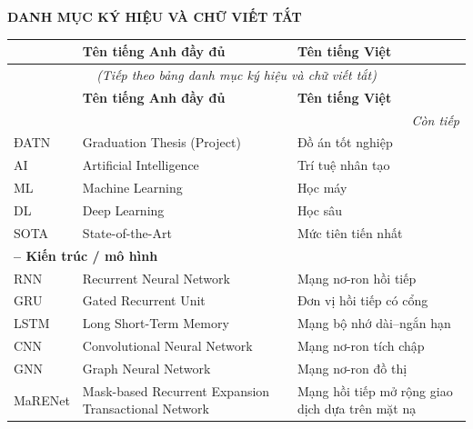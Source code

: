 
\cleardoublepage
{}  %
\thispagestyle{empty}

\begin{center}
    {\bfseries\LARGE DANH MỤC KÝ HIỆU VÀ CHỮ VIẾT TẮT}
\end{center}\vspace{1em}

\begingroup
\setlength\LTleft{0pt}     %
\setlength\LTright{0pt}    %
\small                    %

\begin{longtable}{@{}p{2.5cm} p{6.5cm} p{5.5cm}@{}}  %
\toprule
\textbf{} & \textbf{Tên tiếng Anh đầy đủ} & \textbf{Tên tiếng Việt} \\
\midrule
\endfirsthead

\multicolumn{3}{c}{\itshape (Tiếp theo bảng danh mục ký hiệu và chữ viết tắt)}\\
\textbf{} & \textbf{Tên tiếng Anh đầy đủ} & \textbf{Tên tiếng Việt} \\
\midrule
\endhead

\midrule
\multicolumn{3}{r}{\itshape Còn tiếp}\\
\endfoot
\bottomrule
\endlastfoot

ĐATN     & Graduation Thesis (Project)              & Đồ án tốt nghiệp \\
AI       & Artificial Intelligence                  & Trí tuệ nhân tạo \\
ML       & Machine Learning                         & Học máy \\
DL       & Deep Learning                            & Học sâu \\
SOTA     & State-of-the-Art                         & Mức tiên tiến nhất \\[3pt]

\multicolumn{3}{l}{\textbf{– Kiến trúc / mô hình}}\\
RNN      & Recurrent Neural Network                 & Mạng nơ-ron hồi tiếp \\
GRU      & Gated Recurrent Unit                     & Đơn vị hồi tiếp có cổng \\
LSTM     & Long Short-Term Memory                   & Mạng bộ nhớ dài–ngắn hạn \\
CNN      & Convolutional Neural Network             & Mạng nơ-ron tích chập \\
GNN      & Graph Neural Network                     & Mạng nơ-ron đồ thị \\
MaRENet  & Mask-based Recurrent Expansion Transactional Network & Mạng hồi tiếp mở rộng giao dịch dựa trên mặt nạ \\


\end{longtable}
